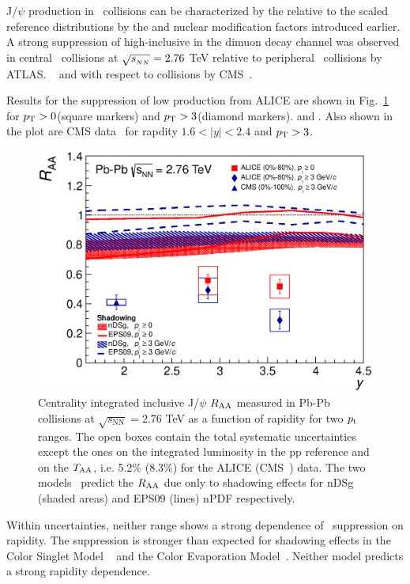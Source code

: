 J/$\psi$ production in \PbPb\ collisions can be characterized by the relative to the \Ncoll scaled reference 
distributions by the \Rcp and \Raa nuclear modification factors introduced earlier.
A strong suppression of high-\pt inclusive \jpsi in the dimuon decay channel was observed in central \PbPb\ collisions
at $\sqrt{s_{_{NN}}} = 2.76$ TeV  relative to peripheral \PbPb\ collisions by ATLAS.
~\cite{Aad:2010aa} and with respect to \pp collisions by CMS~\cite{Chatrchyan:2012np}.

Results for the suppression of low \pt \jpsi production from ALICE are shown 
in Fig.~\ref{fig:GR:raavsy} for $p_{\rm{T}} > 0$\GeVc (square markers) and 
$p_{\rm{T}} > 3$\GeVc (diamond markers). and . Also shown in the plot are CMS data~\cite{Chatrchyan:2012np} 
for rapdity $ 1.6 < |y| < 2.4 $ and $p_{\rm{T}} > 3$\GeVc. 

\begin{figure}
\begin{center}
\includegraphics[width=0.49\linewidth]{qqbarfigures/RAAvsY_v7.eps}
\caption{ \label{fig:GR:raavsy}  Centrality integrated inclusive J/$\psi$ $R_{\rm{AA}}$ measured in Pb-Pb
collisions at $\sqrt{s_{\mathrm{NN}}} = 2.76$ TeV as a function of  rapidity  for two $p_{\rm{t}}$ ranges.
The open boxes contain the total systematic uncertainties except the ones on the integrated luminosity in the pp reference
 and on the $T_{\rm{AA}}$, i.e.  5.2\% (8.3\%) for the  ALICE (CMS~\cite{Chatrchyan:2012np}) data.
The two models~\cite{Ferreiro:2011rw,Vogt:2010aa} predict the  $R_{\rm{AA}}$  due  only to shadowing effects
for  nDSg (shaded areas) and EPS09 (lines) nPDF respectively.}
\end{center}
\end{figure}

Within uncertainties, neither \pt range shows a strong dependence of \jpsi\ suppression on rapidity. 
The suppression is stronger than expected for shadowing effects in the Color Singlet Model
~\cite{Ferreiro:2011rw} and the Color Evaporation Model~\cite{Vogt:2010aa}. Neither model
predicts a strong rapidity dependence.

